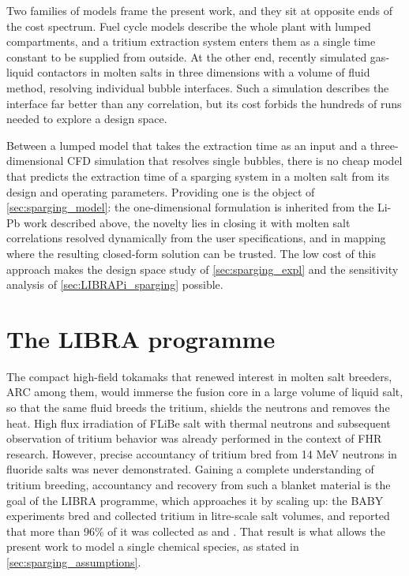 \documentclass[a4paper,11pt,oneside]{report}
\newcounter{assumption}[chapter]
\begin{document}
Two families of models frame the present work, and they sit at opposite ends of the cost spectrum. Fuel cycle models describe the whole plant with lumped compartments, and a tritium extraction system enters them as a single time constant to be supplied from outside\cite{meschini_modeling_2023,delaporte-mathurin_physics-informed_2026}. At the other end, \textcite{li_toward_2026} recently simulated gas-liquid contactors in molten salts in three dimensions with a volume of fluid method, resolving individual bubble interfaces. Such a simulation describes the interface far better than any correlation, but its cost forbids the hundreds of runs needed to explore a design space.

Between a lumped model that takes the extraction time as an input and a three-dimensional CFD simulation that resolves single bubbles, there is no cheap model that predicts the extraction time of a sparging system in a molten salt from its design and operating parameters. Providing one is the object of \cref{sec:sparging_model}: the one-dimensional formulation is inherited from the Li-Pb work described above, the novelty lies in closing it with molten salt correlations resolved dynamically from the user specifications, and in mapping where the resulting closed-form solution can be trusted. The low cost of this approach makes the design space study of \cref{sec:sparging_expl} and the sensitivity analysis of \cref{sec:LIBRAPi_sparging} possible.

\section{The LIBRA programme}

The compact high-field tokamaks that renewed interest in molten salt breeders, ARC among them\cite{sorbom_arc_2015}, would immerse the fusion core in a large volume of liquid salt, so that the same fluid breeds the tritium, shields the neutrons and removes the heat. High flux irradiation of FLiBe salt with thermal neutrons and subsequent observation of tritium behavior was already performed in the context of FHR research\cite{dolan_experimental_2023}. However, precise accountancy of tritium bred from 14 MeV neutrons in fluoride salts was never demonstrated. Gaining a complete understanding of tritium breeding, accountancy and recovery from such a blanket material is the goal of the LIBRA programme\cite{ferry_libra_2023}, which approaches it by scaling up: the BABY experiments bred and collected tritium in litre-scale salt volumes, and reported that more than 96\% of it was collected as  and \cite{delaporte-mathurin_baby_2026}. That result is what allows the present work to model a single chemical species, as stated in \cref{sec:sparging_assumptions}.
\end{document}
